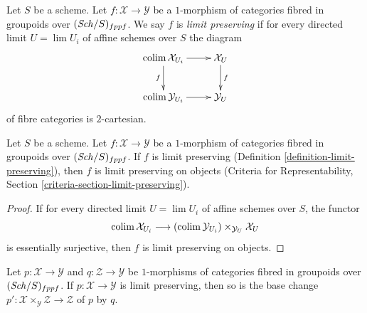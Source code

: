 \begin{definition}
\label{definition-limit-preserving}
Let $S$ be a scheme. Let $f : \mathcal{X} \to \mathcal{Y}$ be a
$1$-morphism of categories fibred in groupoids over $(\mathit{Sch}/S)_{fppf}$.
We say $f$ is {\it limit preserving} if for every directed limit
$U = \lim U_i$ of affine schemes over $S$ the diagram
$$
\xymatrix{
\colim \mathcal{X}_{U_i} \ar[r] \ar[d]_f & \mathcal{X}_U \ar[d]^f \\
\colim \mathcal{Y}_{U_i} \ar[r] & \mathcal{Y}_U
}
$$
of fibre categories is $2$-cartesian.
\end{definition}

\begin{lemma}
\label{lemma-limit-preserving-objects}
Let $S$ be a scheme. Let $f : \mathcal{X} \to \mathcal{Y}$ be a
$1$-morphism of categories fibred in groupoids over $(\mathit{Sch}/S)_{fppf}$.
If $f$ is limit preserving (Definition \ref{definition-limit-preserving}),
then $f$ is limit preserving on objects (Criteria for Representability, Section
\ref{criteria-section-limit-preserving}).
\end{lemma}

\begin{proof}
If for every directed limit $U = \lim U_i$ of affine schemes over $S$,
the functor
$$
\mathop{\mathrm{colim}}\nolimits \mathcal{X}_{U_i} \longrightarrow
(\mathop{\mathrm{colim}}\nolimits \mathcal{Y}_{U_i}) \times_{\mathcal{Y}_U} \mathcal{X}_U
$$
is essentially surjective, then $f$ is limit preserving on objects.
\end{proof}

\begin{lemma}
\label{lemma-base-change-limit-preserving}
Let $p : \mathcal{X} \to \mathcal{Y}$ and $q : \mathcal{Z} \to \mathcal{Y}$
be $1$-morphisms of categories fibred in groupoids over $(\mathit{Sch}/S)_{fppf}$.
If $p : \mathcal{X} \to \mathcal{Y}$ is limit preserving, then so
is the base change
$p' : \mathcal{X} \times_\mathcal{Y} \mathcal{Z} \to \mathcal{Z}$
of $p$ by $q$.
\end{lemma}

